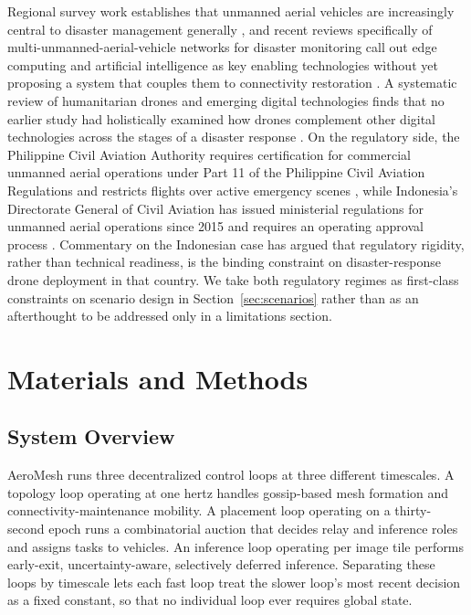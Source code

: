 \documentclass[drones,article,submit,moreauthors]{Definitions/mdpi}
\begin{document}
Regional survey work establishes that unmanned aerial vehicles are increasingly central to disaster management generally \cite{erdelj2017help,erdelj2016uav,shakhatreh2019unmanned}, and recent reviews specifically of multi-unmanned-aerial-vehicle networks for disaster monitoring call out edge computing and artificial intelligence as key enabling technologies without yet proposing a system that couples them to connectivity restoration \cite{chandran2024multi}. A systematic review of humanitarian drones and emerging digital technologies finds that no earlier study had holistically examined how drones complement other digital technologies across the stages of a disaster response \cite{humanitarian2023drones}. On the regulatory side, the Philippine Civil Aviation Authority requires certification for commercial unmanned aerial operations under Part 11 of the Philippine Civil Aviation Regulations and restricts flights over active emergency scenes \cite{caap_rpas}, while Indonesia's Directorate General of Civil Aviation has issued ministerial regulations for unmanned aerial operations since 2015 and requires an operating approval process \cite{icao_indonesia_uas}. Commentary on the Indonesian case has argued that regulatory rigidity, rather than technical readiness, is the binding constraint on disaster-response drone deployment in that country. We take both regulatory regimes as first-class constraints on scenario design in Section~\ref{sec:scenarios} rather than as an afterthought to be addressed only in a limitations section.

\section{Materials and Methods}
\label{sec:methods}

\subsection{System Overview}

AeroMesh runs three decentralized control loops at three different timescales. A topology loop operating at one hertz handles gossip-based mesh formation and connectivity-maintenance mobility. A placement loop operating on a thirty-second epoch runs a combinatorial auction that decides relay and inference roles and assigns tasks to vehicles. An inference loop operating per image tile performs early-exit, uncertainty-aware, selectively deferred inference. Separating these loops by timescale lets each fast loop treat the slower loop's most recent decision as a fixed constant, so that no individual loop ever requires global state.
\end{document}
